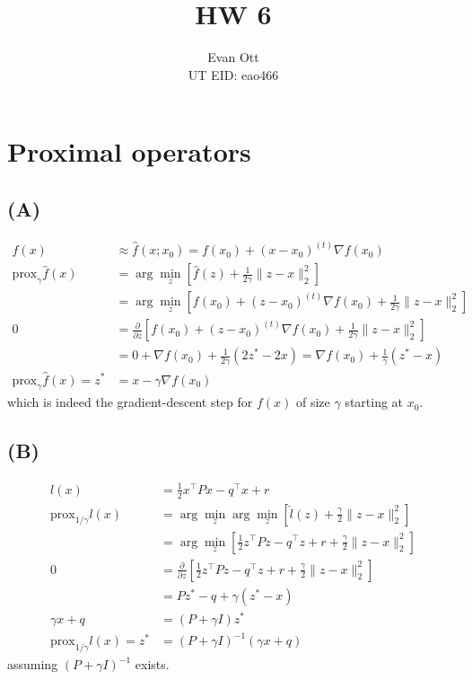 \documentclass{article}
\title{\vspace{-6ex}HW 6\vspace{-2ex}}
\author{Evan Ott \\ UT EID: eao466\vspace{-2ex}}
\begin{document}
\maketitle
\section{Proximal operators}
\subsection{(A)}
\begin{align*}
f(x)&\approx \hat{f}(x;x_0)=f(x_0)+(x-x_0)^{(t)}\nabla f(x_0)\\
\textrm{prox}_\gamma \hat{f}(x)&=\arg\min_z \left[ \hat{f}(z) + \frac{1}{2\gamma} \lVert z-x\rVert_2^2 \right]\\
&=\arg\min_z \left[ f(x_0)+(z-x_0)^{(t)}\nabla f(x_0) + \frac{1}{2\gamma} \lVert z-x\rVert_2^2 \right]\\
0&=\frac{\partial}{\partial z}\left[ f(x_0)+(z-x_0)^{(t)}\nabla f(x_0) + \frac{1}{2\gamma} \lVert z-x\rVert_2^2 \right]\\
&=0 + \nabla f(x_0) + \frac{1}{2\gamma}(2z^* - 2x)=\nabla f(x_0) + \frac{1}{\gamma}(z^* - x)\\
\textrm{prox}_\gamma \hat{f}(x)=z^*&=x-\gamma \nabla f(x_0)
\end{align*}
which is indeed the gradient-descent step for $f(x)$ of size $\gamma$ starting at $x_0$.

\subsection{(B)}
\begin{align*}
l(x)&=\frac{1}{2}x^\top P x - q^\top x + r\\
\textrm{prox}_{1/\gamma}l(x)&=\arg\min_z \arg\min_z \left[ \hat{l}(z) + \frac{\gamma}{2} \lVert z-x\rVert_2^2 \right]\\
&= \arg\min_z \left[ \frac{1}{2}z^\top P z - q^\top z + r + \frac{\gamma}{2} \lVert z-x\rVert_2^2 \right]\\
0&=\frac{\partial}{\partial z}\left[ \frac{1}{2}z^\top P z - q^\top z + r + \frac{\gamma}{2} \lVert z-x\rVert_2^2 \right]\\
&=Pz^* - q + \gamma (z^* - x)\\
\gamma x + q&= \left(P + \gamma I\right) z^*\\
\textrm{prox}_{1/\gamma}l(x)=z^*&=\left(P + \gamma I\right)^{-1}(\gamma x + q)
\end{align*}
assuming $\left(P + \gamma I\right)^{-1}$ exists.
\end{document}
